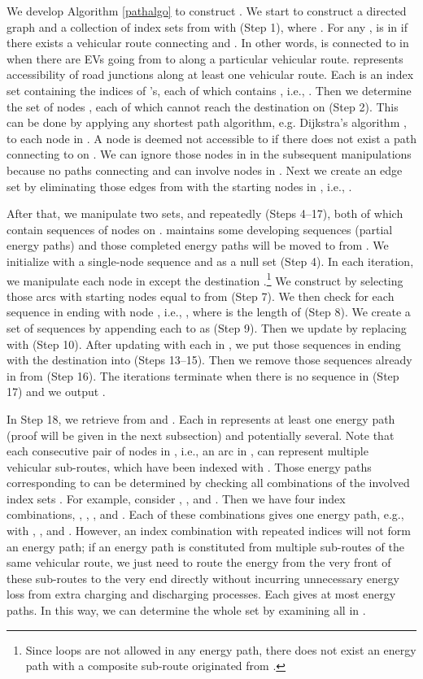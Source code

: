 \documentclass[journal]{IEEEtran}
\begin{document}
We develop Algorithm \ref{pathalgo} to construct . We start to construct a directed graph  and a collection of index sets  from  with  (Step 1), where . For any ,  is in  if there exists a vehicular route  connecting  and . In other words,  is connected to  in  when there are EVs going from  to  along a particular vehicular route.  represents accessibility of road junctions along at least one  vehicular route. 
Each  is an index set containing the indices of 's, each of which contains , i.e., . 
Then we determine the set of nodes , each  of which cannot reach the destination  on  (Step 2). This can be done by applying any shortest path algorithm, e.g. Dijkstra's algorithm \cite{dijkstra},  to each node in . A node  is deemed not accessible to  if there does not exist a path connecting  to  on  . We can ignore those nodes in  in the subsequent manipulations because no paths connecting  and  can involve nodes in .
Next we create an edge set  by eliminating those edges from  with the starting nodes in , i.e., . 

After that, we manipulate two sets,  and  repeatedly (Steps 4--17), both of which contain sequences of nodes on .  maintains some developing sequences (partial energy paths) and those completed energy paths will be moved to   from . We initialize  with a single-node sequence  and  as a null set (Step 4). In each iteration, we manipulate each node  in  except the destination .\footnote{Since loops are not allowed in any energy path, there does not exist an energy path with a composite sub-route originated from .} We construct  by selecting those arcs with starting nodes equal to  from  (Step 7). We then check for each sequence  in  ending with node , i.e., , where  is the length of  (Step 8). We create a set  of  sequences by appending each  to  as  (Step 9). Then we update  by replacing  with  (Step 10). After updating  with each  in , we put those sequences in   ending with the destination  into  (Steps 13--15). Then we remove those sequences already in  from  (Step 16). The iterations terminate when there is no sequence in  (Step 17) and we output .

In Step 18, we retrieve  from  and . Each  in  represents at least one energy path (proof will be given in the next subsection) and potentially several. Note that each consecutive pair of nodes   in , i.e., an arc in , can represent multiple vehicular sub-routes, which have been indexed with . Those energy paths corresponding to  can be determined by checking all combinations of the involved index sets . For example, consider , , and . Then we have four index combinations, , ,  , and . Each of these combinations gives one energy path, e.g.,  with , , and . 
However, an index combination with repeated indices will not form an energy path; if an energy path is constituted from multiple sub-routes of the same vehicular route, we just need to route the energy from the very front of these sub-routes to the very end directly without incurring unnecessary energy loss from extra charging and discharging processes.
Each  gives at most  energy paths. 
In this way, we can determine the whole set  by examining all  in .
\end{document}
